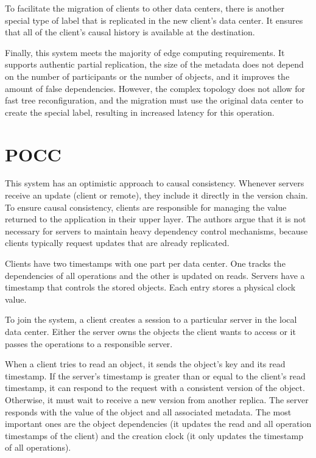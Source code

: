 To facilitate the migration of  clients to other data centers, there is another special type of label that is replicated in the new  client's data center. It ensures that all of the  client's causal history is available at the destination. 

Finally, this system meets the majority of edge computing requirements. It supports authentic partial replication, the size of the metadata does not depend on the number of participants or the number of objects, and it improves the amount of false dependencies. However, the complex topology does not allow for fast tree reconfiguration, and the migration must use the original data center to create the special label, resulting in increased latency for this operation.

\section{POCC}
\label{sec:soa:pocc}

This system \cite{spirovska2017optimistic} has an optimistic approach to causal consistency. Whenever servers receive an update (client or remote), they include it directly in the version chain. To ensure causal consistency, clients are responsible for managing the value returned to the application in their upper layer. The authors argue that it is not necessary for servers to maintain heavy dependency control mechanisms, because clients typically request updates that are already replicated. 

Clients have two timestamps with one part per data center. One tracks the dependencies of all operations and the other is updated on reads. Servers have a timestamp that controls the stored objects. Each entry stores a physical clock value. 

To join the system, a client creates a session to a particular server in the local data center. Either the server owns the objects the client wants to access or it passes the operations to a responsible server. 

When a client tries to read an object, it sends the object's key and its read timestamp. If the server's timestamp is greater than or equal to the client's read timestamp, it can respond to the request with a consistent version of the object. Otherwise, it must wait to receive a new version from another replica. The server responds with the value of the object and all associated metadata. The most important ones are the object dependencies (it updates the read and all operation timestamps of the client) and the creation clock (it only updates the timestamp of all operations). 

